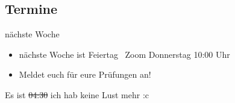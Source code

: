 \documentclass[aspectratio=169,usepdftitle=true,11pt,ngerman,t]{beamer}
\begin{document}
\subsection{Termine}
\begin{frame}{nächste Woche}
    \begin{itemize}
        \item nächste Woche ist Feiertag
        \faAngleRight~Zoom Donnerstag 10:00 Uhr
        \item Meldet euch für eure Prüfungen an!
    \end{itemize}

    \vspace{\fill}\vspace{\fill} \Tiny Es ist \sout{04:30} ich hab keine Lust mehr :c
\end{frame}
\end{document}
